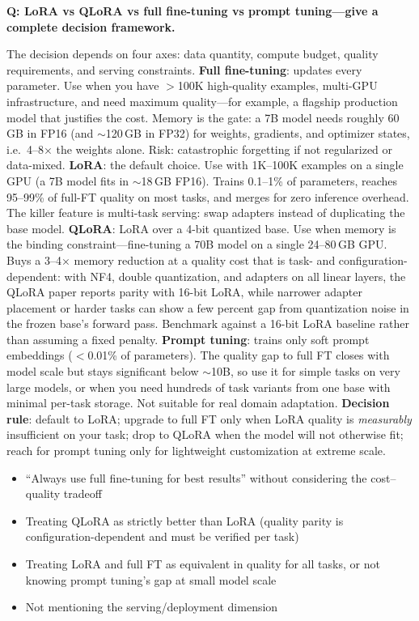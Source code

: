 \begin{interviewq}
\textbf{Q: LoRA vs QLoRA vs full fine-tuning vs prompt tuning---give a complete decision framework.}

 \quad {} \quad \badgefreq{\freqhigh}

\stronganswer The decision depends on four axes: data quantity, compute budget, quality requirements, and serving constraints. \textbf{Full fine-tuning}: updates every parameter. Use when you have $>$100K high-quality examples, multi-GPU infrastructure, and need maximum quality---for example, a flagship production model that justifies the cost. Memory is the gate: a 7B model needs roughly 60\,GB in FP16 (and $\sim$120\,GB in FP32) for weights, gradients, and optimizer states, i.e.\ 4--8$\times$ the weights alone. Risk: catastrophic forgetting if not regularized or data-mixed. \textbf{LoRA}: the default choice. Use with 1K--100K examples on a single GPU (a 7B model fits in $\sim$18\,GB FP16). Trains 0.1--1\% of parameters, reaches 95--99\% of full-FT quality on most tasks, and merges for zero inference overhead. The killer feature is multi-task serving: swap adapters instead of duplicating the base model. \textbf{QLoRA}: LoRA over a 4-bit quantized base. Use when memory is the binding constraint---fine-tuning a 70B model on a single 24--80\,GB GPU. Buys a 3--4$\times$ memory reduction at a quality cost that is task- and configuration-dependent: with NF4, double quantization, and adapters on all linear layers, the QLoRA paper reports parity with 16-bit LoRA, while narrower adapter placement or harder tasks can show a few percent gap from quantization noise in the frozen base's forward pass. Benchmark against a 16-bit LoRA baseline rather than assuming a fixed penalty. \textbf{Prompt tuning}: trains only soft prompt embeddings ($<$0.01\% of parameters). The quality gap to full FT closes with model scale but stays significant below $\sim$10B, so use it for simple tasks on very large models, or when you need hundreds of task variants from one base with minimal per-task storage. Not suitable for real domain adaptation. \textbf{Decision rule}: default to LoRA; upgrade to full FT only when LoRA quality is \emph{measurably} insufficient on your task; drop to QLoRA when the model will not otherwise fit; reach for prompt tuning only for lightweight customization at extreme scale.

\redflags
\begin{itemize}
    \item ``Always use full fine-tuning for best results'' without considering the cost--quality tradeoff
    \item Treating QLoRA as strictly better than LoRA (quality parity is configuration-dependent and must be verified per task)
    \item Treating LoRA and full FT as equivalent in quality for all tasks, or not knowing prompt tuning's gap at small model scale
    \item Not mentioning the serving/deployment dimension
\end{itemize}


\end{interviewq}
